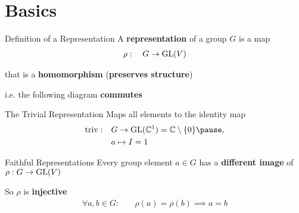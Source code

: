 
\section{Basics}

\begin{frame}{Definition of a Representation}
    \large
    A \textbf{representation} of a group $G$ is a map
    \Large
    \begin{align*}
        \rho: \quad G \to \operatorname{GL}(V)
    \end{align*}
    
    \normalsize
    \pause
    that is a \textbf{homomorphism} (\textbf{preserves structure})

    \pause
    i.e. the following diagram \textbf{commutes}
    \begin{figure}
        \centering
    \end{figure}
    {\hspace*{\fill} \cite{hein2013}}

\end{frame}

\begin{frame}{The Trivial Representation}
    \large
    Maps all elements to the identity map
    \Large
        \pause
    \begin{align*}
        \triv: \quad & G \to \GL(\C^1) = \C \setminus \{0\} \pause , \\
        & a \mapsto I = 1
    \end{align*}
    
    \normalsize
    {\hspace*{\fill} \cite{hein2013}}
\end{frame}

\begin{frame}{Faithful Representations}
    \large
    Every group element $a \in G$ has a \textbf{different image} of $\rho: G \to \operatorname{GL}(V)$

    \pause
    So $\rho$ is \textbf{injective}
    \Large
    \begin{align*}
        \forall a, b \in G: \quad & \rho(a) = \rho(b) \implies a = b
    \end{align*}
    \normalsize
    {\hspace*{\fill} \cite{hein2013}}
\end{frame}

